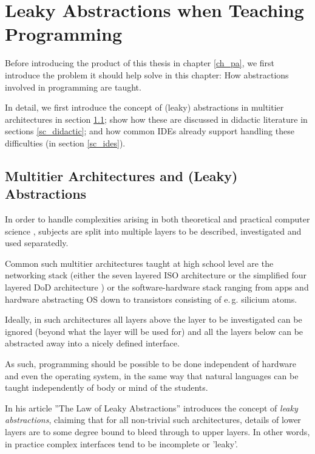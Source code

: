 
\chapter{Leaky Abstractions when Teaching Programming} \label{ch_theory}

Before introducing the product of this thesis in chapter \ref{ch_pa}, we first introduce the problem it should help solve in this chapter: How abstractions involved in programming are taught.

In detail, we first introduce the concept of (leaky) abstractions in multitier architectures in section \ref{sc_abstractions}; show how these are discussed in didactic literature in sections \ref{sc_didactic}; and how common IDEs already support handling these difficulties (in section \ref{sc_ides}).


\section{Multitier Architectures and (Leaky) Abstractions} \label{sc_abstractions}
In order to handle complexities arising in both theoretical and practical computer science , subjects are split into multiple layers to be described, investigated and used separatedly.

Common such multitier architectures taught at high school level are the networking stack (either the seven layered ISO architecture or the simplified four layered DoD architecture ) or the software-hardware stack ranging from apps and hardware abstracting OS down to transistors consisting of e.\,g. silicium atoms.


Ideally, in such architectures all layers above the layer to be investigated can be ignored (beyond what the layer will be used for) and all the layers below can be abstracted away into a nicely defined interface.

As such, programming should be possible to be done independent of hardware and even the operating system, in the same way that natural languages can be taught independently of body or mind of the students.

In his article ''The Law of Leaky Abstractions'' \citep{Spo02} introduces the concept of \emph{leaky abstractions}, claiming that for all non-trivial such architectures, details of lower layers are to some degree bound to bleed through to upper layers. In other words, in practice complex interfaces tend to be incomplete or 'leaky'.

